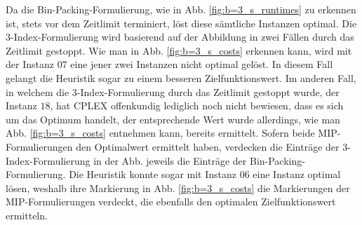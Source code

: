 Da die Bin-Packing-Formulierung, wie in Abb. \ref{fig:b=3_s_runtimes} zu erkennen ist, stets vor dem Zeitlimit terminiert,
löst diese sämtliche Instanzen optimal. Die 3-Index-Formulierung wird basierend auf der Abbildung in zwei Fällen
durch das Zeitlimit gestoppt. Wie man in Abb. \ref{fig:b=3_s_costs} erkennen kann, wird mit der
Instanz $07$ eine jener zwei Instanzen nicht optimal gelöst.
In diesem Fall gelangt die Heuristik sogar zu einem besseren Zielfunktionswert.
Im anderen Fall, in welchem die 3-Index-Formulierung durch das Zeitlimit gestoppt wurde, der Instanz $18$, hat \textsc{CPLEX}
offenkundig lediglich noch nicht bewiesen, dass es sich um das Optimum handelt, der entsprechende Wert wurde allerdings,
wie man Abb. \ref{fig:b=3_s_costs} entnehmen kann, bereits ermittelt. Sofern beide MIP-Formulierungen den Optimalwert ermittelt haben,
verdecken die Einträge der 3-Index-Formulierung in der Abb. jeweils die Einträge der Bin-Packing-Formulierung.
Die Heuristik konnte sogar mit Instanz $06$ eine Instanz optimal lösen, weshalb ihre Markierung in Abb. \ref{fig:b=3_s_costs} die
Markierungen der MIP-Formulierungen verdeckt, die ebenfalls den optimalen Zielfunktionswert ermitteln.

